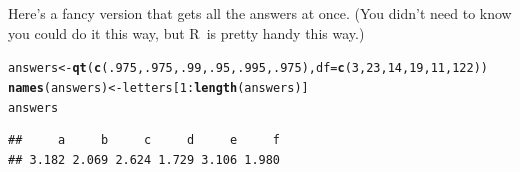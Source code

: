 \documentclass[twoside]{book}\usepackage[]{graphicx}\usepackage[]{xcolor}
\makeatletter
\newcommand{\hlnum}[1]{\textcolor[rgb]{0.686,0.059,0.569}{#1}}%
\newcommand{\hlopt}[1]{\textcolor[rgb]{0,0,0}{#1}}%
\newcommand{\hlstd}[1]{\textcolor[rgb]{0.345,0.345,0.345}{#1}}%
\newcommand{\hlkwb}[1]{\textcolor[rgb]{0.69,0.353,0.396}{#1}}%
\newcommand{\hlkwc}[1]{\textcolor[rgb]{0.333,0.667,0.333}{#1}}%
\newcommand{\hlkwd}[1]{\textcolor[rgb]{0.737,0.353,0.396}{\textbf{#1}}}%
\newenvironment{kframe}{%
 \def\at@end@of@kframe{}%
 \ifinner\ifhmode%
  \def\at@end@of@kframe{\end{minipage}}%
  \begin{minipage}{\columnwidth}%
 \fi\fi%
 \def\FrameCommand##1{\hskip\@totalleftmargin \hskip-\fboxsep
 \colorbox{shadecolor}{##1}\hskip-\fboxsep
     \hskip-\linewidth \hskip-\@totalleftmargin \hskip\columnwidth}%
 \MakeFramed {\advance\hsize-\width
   \@totalleftmargin\z@ \linewidth\hsize
   \@setminipage}}%
 {\par\unskip\endMakeFramed%
 \at@end@of@kframe}
\newenvironment{knitrout}{}{} %
\def\R{{\sf R}}
\makeatother
\begin{document}
\begin{solution}
Here's a fancy version that gets all the answers at once.  (You didn't need to know
you could do it this way, but \R\ is pretty handy this way.)
\begin{knitrout}
\color{fgcolor}\begin{kframe}
\begin{alltt}
\hlstd{answers} \hlkwb{<-} \hlkwd{qt}\hlstd{(}\hlkwd{c}\hlstd{(}\hlnum{.975}\hlstd{,} \hlnum{.975}\hlstd{,} \hlnum{.99}\hlstd{,} \hlnum{.95}\hlstd{,} \hlnum{.995}\hlstd{,} \hlnum{.975}\hlstd{),} \hlkwc{df} \hlstd{=} \hlkwd{c}\hlstd{(}\hlnum{3}\hlstd{,}\hlnum{23}\hlstd{,}\hlnum{14}\hlstd{,}\hlnum{19}\hlstd{,}\hlnum{11}\hlstd{,}\hlnum{122}\hlstd{))}
\hlkwd{names}\hlstd{(answers)} \hlkwb{<-} \hlstd{letters[}\hlnum{1}\hlopt{:}\hlkwd{length}\hlstd{(answers)]}
\hlstd{answers}
\end{alltt}
\begin{verbatim}
##     a     b     c     d     e     f 
## 3.182 2.069 2.624 1.729 3.106 1.980
\end{verbatim}
\end{kframe}
\end{knitrout}
\end{solution}
\end{document}
